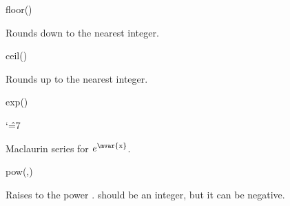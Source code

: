 \begin{math-function}{floor()}

	Rounds  down to the nearest integer. 
	
\begin{codeexample}[post=\tt\footnotesize\pgfmathresult]
\end{codeexample}

\begin{codeexample}[post=\tt\footnotesize\pgfmathresult]
\end{codeexample}

\end{math-function}

\begin{math-function}{ceil()}

	Rounds  up to the nearest integer. 

\begin{codeexample}[post=\tt\footnotesize\pgfmathresult]
\end{codeexample}

\begin{codeexample}[post=\tt\footnotesize\pgfmathresult]
\end{codeexample}

\end{math-function}

\begin{math-function}{exp()}
{
\catcode`\^=7

	Maclaurin series for $e^\textrm{\mvar{x}}$. 
}	
\begin{codeexample}[post=\tt\footnotesize\pgfmathresult]
\end{codeexample}

\begin{codeexample}[post=\tt\footnotesize\pgfmathresult]
\end{codeexample}

\end{math-function}

\begin{math-function}{pow(,)}

 Raises  to the power .  should be an integer, but it can be negative. 

\begin{codeexample}[post=\tt\footnotesize\pgfmathresult]
\end{codeexample}

\end{math-function}

